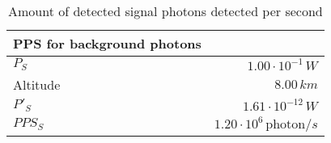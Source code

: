 \begin{table}[H]
\centering
\caption{Amount of detected signal photons detected per second}
\label{tab:PPS_S}
\begin{tabular}{|l|r|}\hline
    \textbf{PPS for background photons} & \\
    \hline 
    $P_S$ & $1.00\cdot10^{-1}\,W$ \\
    Altitude & $8.00\, km$ \\
    $P'_S$ & $1.61\cdot10^{-12}\,W$ \\
    $PPS_S$ & $1.20\cdot10^{6}\,\text{photon}/s$ \\
    \hline 
\end{tabular}
\end{table}
